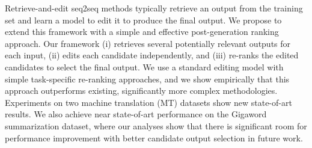 Retrieve-and-edit seq2seq methods typically retrieve an output from the training set and learn a model to edit it to produce the final output. We propose to extend this framework with a simple and effective post-generation ranking approach. Our framework (i) retrieves several potentially relevant outputs for each input, (ii) edits each candidate independently, and (iii) re-ranks the edited candidates to select the final output. We use a standard editing model with simple task-specific re-ranking approaches, and we show empirically that this approach outperforms existing, significantly more complex methodologies. Experiments on two machine translation (MT) datasets show new state-of-art results. We also achieve near state-of-art performance on the Gigaword summarization dataset, where our analyses show that there is significant room for performance improvement with better candidate output selection in future work.
